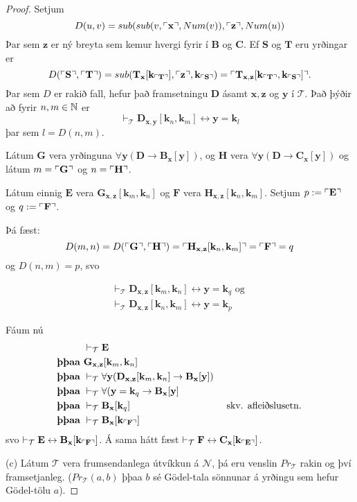 \documentclass[12pt]{book}
\newcommand{\cT}{\mathcal{T}}
\newcommand{\cN}{\mathcal{N}}
\newcommand{\bB}{\mathbf{B}}
\newcommand{\bS}{\mathbf{S}}
\newcommand{\bC}{\mathbf{C}}
\newcommand{\bG}{\mathbf{G}}
\newcommand{\vT}{\vdash_{\cT}}
\newcommand{\bE}{\mathbf{E}}
\newcommand{\bF}{\mathbf{F}}
\newcommand{\bT}{\mathbf{T}}
\newcommand{\bD}{\mathbf{D}}
\newcommand{\bH}{\mathbf{H}}
\newcommand{\bx}{\mathbf{x}}
\newcommand{\bz}{\mathbf{z}}
\newcommand{\bk}{\mathbf{k}}
\newcommand{\by}{\mathbf{y}}
\DeclarePairedDelimiter{\god}{\ulcorner}{\urcorner}
\begin{document}
\begin{proof}
  Setjum 
  \[ D(u,v) = sub(sub(v,\god{\bx},Num(v)), \god{\bz},Num(u)) \]
  Þar sem $\bz$ er ný breyta sem kemur hvergi fyrir í $\bB$ og $\bC$.
  Ef $\bS$ og $\bT$ eru yrðingar er
  \[ D(\god{\bS},\god{\bT}) = sub(\bT_{\bx}[\bk_{\god{\bT}}], \god{\bz},\bk_{\god{\bS}}) = \god{\bT_{\bx,\bz}[\bk_{\god{\bT}}, \bk_{\god{\bS}}] } .\]
 Þar sem $D$ er rakið fall, hefur það framsetningu $\bD$ ásamt $\bx, \bz$ og $\by$ í $\cT$.
 Það þýðir að fyrir $n,m \in \mathbb{N}$ er
 \[ \vT \bD_{\bx,\by}[\bk_n, \bk_m] \leftrightarrow \by = \bk_l \]
 þar sem $l = D(n,m)$.
 
 Látum $\bG$ vera yrðinguna $\forall \by (\bD \to \bB_{\bx}[\by])$,
 og $\bH$ vera $\forall \by ( \bD \to \bC_{\bx}[\by] ) $
 og látum $m = \god{\bG}$ og $n = \god{\bH}$.

 Látum einnig $\bE$ vera $\bG_{\bx, \bz}[\bk_m, \bk_n]$ og $\bF$ vera
 $\bH_{\bx,\bz}[\bk_n, \bk_m]$. Setjum $p:= \god{\bE}$ og $q:= \god{\bF}$.

 Þá fæst:
 \[ D(m,n) = D(\god{\bG}, \god{\bH}) = \god{\bH_{\bx,\bz} [\bk_n,\bk_m]} = \god{\bF} = q \]
 og $D(n,m) = p$,
 svo

 \begin{gather*}
   \vT \bD_{\bx,\bz}[\bk_m,\bk_n] \leftrightarrow \by = \bk_q \text{ og } \\
   \vT \bD_{\bx,\bz}[\bk_n,\bk_m] \leftrightarrow \by = \bk_p
 \end{gather*}

 Fáum nú
 \begin{align*}
   & \vT \bE & \\
 \text{ \textbf{þþaa} } & \bG_{\bx,\bz}[\bk_m,\bk_n] & \\
\text{ \textbf{þþaa} } & \vT \forall \by (\bD_{\bx,\bz}[\bk_m, \bk_n] \to \bB_{\bx}[\by]) & \\
\text{ \textbf{þþaa} } & \vT \forall (\by = \bk_q \to \bB_{\bx}[\by]  & \\
\text{ \textbf{þþaa} } & \vT \bB_{\bx}[\bk_q]  & \text{ skv. afleiðslusetn. } \\
\text{ \textbf{þþaa} } & \vT \bB_{\bx}[\bk_{\god{\bF}}] & \\
 \end{align*}
svo $\vT \bE \leftrightarrow \bB_{\bx}[\bk_{\god{\bF}}]$.
Á sama hátt fæst
$\vT \bF \leftrightarrow \bC_{\bx}[\bk_{\god{\bE}}]$.

(c) Látum $\cT$ vera frumsendanlega útvíkkun á $\cN$, þá eru venslin $Pr_{\cT}$ rakin
og því framsetjanleg. ($Pr_{\cT}(a,b)$ þþaa  $b$ sé Gödel-tala sönnunar á yrðingu sem hefur Gödel-tölu $a$).


\end{proof}
\end{document}
